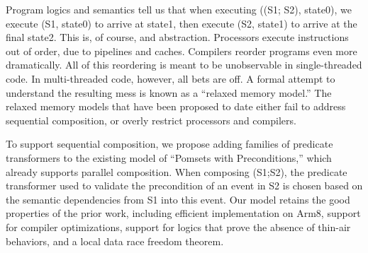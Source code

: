 
Program logics and semantics tell us that when executing ((S1; S2), state0),
we execute (S1, state0) to arrive at state1, then execute (S2, state1) to
arrive at the final state2.  This is, of course, and abstraction.  Processors
execute instructions out of order, due to pipelines and caches.  Compilers
reorder programs even more dramatically.  All of this reordering is meant to
be unobservable in single-threaded code.  In multi-threaded code, however,
all bets are off.  A formal attempt to understand the resulting mess is known
as a ``relaxed memory model.''  The relaxed memory models that have been
proposed to date either fail to address sequential composition, or overly
restrict processors and compilers.

To support sequential composition, we propose adding families of predicate
transformers to the existing model of ``Pomsets with Preconditions,'' which
already supports parallel composition.  When composing (S1;S2), the predicate
transformer used to validate the precondition of an event in S2 is chosen
based on the semantic dependencies from S1 into this event.  Our model
retains the good properties of the prior work, including efficient
implementation on Arm8, support for compiler optimizations, support for
logics that prove the absence of thin-air behaviors, and a local data race
freedom theorem.
